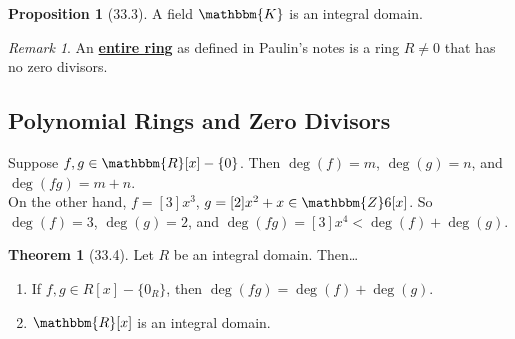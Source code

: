 \documentclass{article}
\newcommand{\Z}{\mathbbm{Z}}
\newcommand{\R}{\mathbbm{R}}
\newcommand{\define}[1]{\textbf{\underline{#1}}}
\theoremstyle{definition}
\newtheorem*{thm}{Theorem}
\newtheorem*{prop}{Proposition}
\theoremstyle{remark}
\newtheorem*{rmk}{Remark}
\newcommand{\K}{\mathbbm{K}}
\begin{document}
{        \begin{prop}[33.3]
            A field $\K$ is an integral domain.
        \end{prop}
        
        \begin{rmk}
            An \define{entire ring} as defined in Paulin's notes is a ring $R\neq 0$ that has no zero divisors.
        \end{rmk}
        
        \subsection*{Polynomial Rings and Zero Divisors}{
            Suppose $f,g \in \R[x]-\{0\}$. Then $\deg(f)=m$, $\deg(g)=n$, and $\deg(fg)=m+n$.\\
            On the other hand, $f=[3]x^3$, $g=[2]x^2+x \in \Z6[x]$. So $\deg(f)=3$, $\deg(g)=2$, and $\deg(fg)=[3]x^4 < \deg(f)+\deg(g)$.
            
            \begin{thm}[33.4]
                Let $R$ be an integral domain. Then\ldots
                \begin{enumerate}
                    \item If $f,g \in R[x]-\{0_R\}$, then $\deg (fg)=\deg(f)+\deg(g)$.
                    \item $\R[x]$ is an integral domain.
                \end{enumerate}
            \end{thm}
        }
    }
\end{document}
